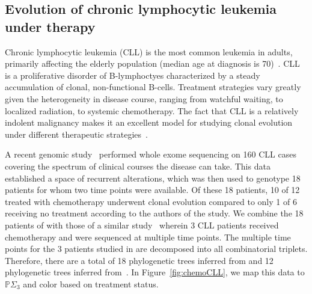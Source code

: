 \documentclass[a4paper,11pt]{article}
\begin{document}
\subsection{Evolution of chronic lymphocytic leukemia under therapy}\label{sec:CLL}

Chronic lymphocytic leukemia (CLL) is the most common leukemia in adults, primarily affecting the elderly population (median age at diagnosis is 70)~\cite{smith2011incidence}.
CLL is a proliferative disorder of B-lymphoctyes characterized by a steady accumulation of clonal, non-functional B-cells.
Treatment strategies vary greatly given the heterogeneity in disease course, ranging from watchful waiting, to localized radiation, to systemic chemotherapy.
The fact that CLL is a relatively indolent malignancy makes it an excellent model for studying clonal evolution under different therapeutic strategies~\cite{wang2015tumor}.

A recent genomic study~\cite{landau2013evolution} performed whole exome sequencing on 160 CLL cases covering the spectrum of clinical courses the disease can take.
This data established a space of recurrent alterations, which was then used to genotype 18 patients for whom two time points were available.
Of these 18 patients, 10 of 12 treated with chemotherapy underwent clonal evolution compared to only 1 of 6 receiving no treatment according to the authors of the study.
We combine the 18 patients of \cite{landau2013evolution} with those of a similar study~\cite{schuh2012monitoring} wherein 3 CLL patients received chemotherapy and were sequenced at multiple time points.
The multiple time points for the 3 patients studied in \cite{schuh2012monitoring} are decomposed into all combinatorial triplets.
Therefore, there are a total of 18 phylogenetic trees inferred from \cite{landau2013evolution} and 12 phylogenetic trees inferred from~\cite{schuh2012monitoring}.
In Figure~\ref{fig:chemoCLL}, we map this data to $\mathbb{P}\Sigma_3$ and color based on treatment status.
\end{document}
